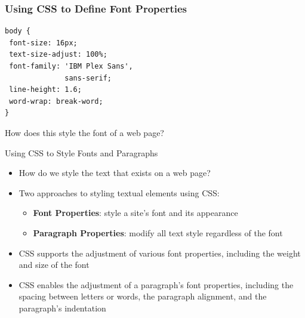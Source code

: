 \documentclass[14pt,aspectratio=169]{beamer}
\begin{document}
%
\begin{frame}[fragile]
  \frametitle{Using CSS to Define Font Properties}
  \normalsize
  \hspace*{.25in}
  \begin{minipage}{6in}
    \vspace*{.15in}
    \begin{verbatim}
body {
 font-size: 16px;
 text-size-adjust: 100%;
 font-family: 'IBM Plex Sans',
              sans-serif;
 line-height: 1.6;
 word-wrap: break-word;
}
    \end{verbatim}
  \end{minipage}
  \vspace*{-.05in}
  \begin{center}
    \noindent How does this style the font of a web page? \\
  \end{center}
\end{frame}

%
\begin{frame}{Using CSS to Style Fonts and Paragraphs}
  \begin{itemize}
    \item How do we style the text that exists on a web page?
      \vspace*{-.2in}
    \item Two approaches to styling textual elements using CSS:
      \begin{itemize}
        \item {\bf Font Properties}: style a site's font and its appearance
        \item {\bf Paragraph Properties}: modify all text style regardless of
          the font
      \end{itemize}
      \vspace*{-.2in}
    \item CSS supports the adjustment of various font properties, including the
      weight and size of the font
      \vspace*{-.2in}
    \item CSS enables the adjustment of a paragraph's font properties, including
      the spacing between letters or words, the paragraph alignment, and the
      paragraph's indentation
  \end{itemize}
\end{frame}
\end{document}

